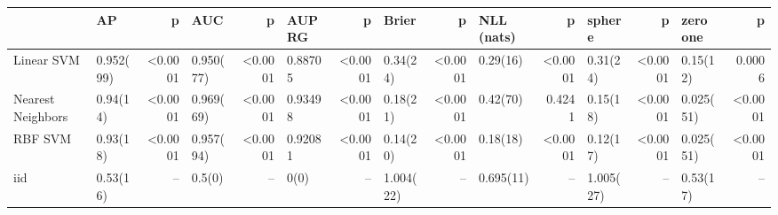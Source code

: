 \documentclass{article}
\begin{document}
\begin{center}
{\tiny
\setlength{\tabcolsep}{0.75em} %
\begin{tabular}{|l|l|r|l|r|l|r|l|r|l|r|l|r|l|r|}
\toprule
{}                &       {AP} &      {p} &      {AUC} &      {p} &  {AUPRG} &      {p} &    {Brier} &      {p} & {NLL (nats)} &      {p} &   {sphere} &      {p} & {zero one} &      {p} \\
\midrule
Linear SVM        &  0.952(99) &  <0.0001 &  0.950(77) &  <0.0001 &  0.88705 &  <0.0001 &  0.34(24)  &  <0.0001 &    0.29(16)  &  <0.0001 &  0.31(24)  &  <0.0001 &  0.15(12)  &   0.0006 \\
Nearest Neighbors &  0.94(14)  &  <0.0001 &  0.969(69) &  <0.0001 &  0.93498 &  <0.0001 &  0.18(21)  &  <0.0001 &    0.42(70)  &   0.4241 &  0.15(18)  &  <0.0001 &  0.025(51) &  <0.0001 \\
RBF SVM           &  0.93(18)  &  <0.0001 &  0.957(94) &  <0.0001 &  0.92081 &  <0.0001 &  0.14(20)  &  <0.0001 &    0.18(18)  &  <0.0001 &  0.12(17)  &  <0.0001 &  0.025(51) &  <0.0001 \\
iid               &  0.53(16)  &     {--} &  0.5(0)    &     {--} &  0(0)    &     {--} &  1.004(22) &     {--} &    0.695(11) &     {--} &  1.005(27) &     {--} &  0.53(17)  &     {--} \\
\bottomrule
\end{tabular}
}
\end{center}
\end{document}
